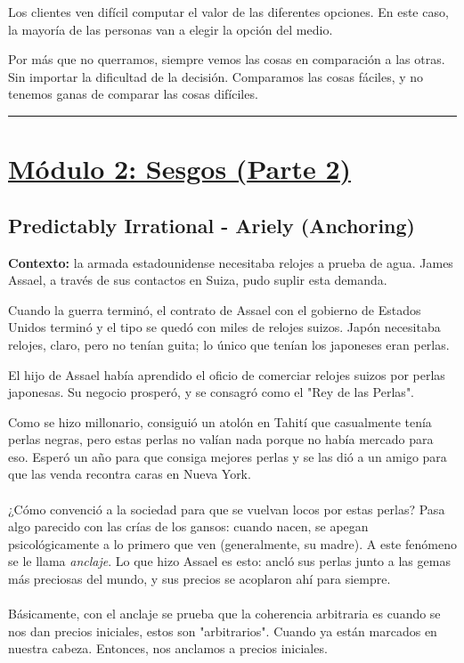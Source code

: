 \documentclass{article}
\newcommand*\sepline{%
  \begin{center}
    \rule[1ex]{.5\textwidth}{.5pt}
  \end{center}}
\begin{document}
            Los clientes ven difícil computar el valor de las diferentes opciones. En este caso, la mayoría de las personas van a elegir la opción del medio.

            Por más que no querramos, siempre vemos las cosas en comparación a las otras. Sin importar la dificultad de la decisión. Comparamos las cosas fáciles, y no tenemos ganas de comparar las cosas difíciles.

    \sepline

    \section*{\underline{Módulo 2: Sesgos (Parte 2)}}
        \subsection*{Predictably Irrational - Ariely (Anchoring)}
            \textbf{Contexto:} la armada estadounidense necesitaba relojes a prueba de agua. James Assael, a través de sus contactos en Suiza, pudo suplir esta demanda.
            
            Cuando la guerra terminó, el contrato de Assael con el gobierno de Estados Unidos terminó y el tipo se quedó con miles de relojes suizos. Japón necesitaba relojes, claro, pero no tenían guita; lo único que tenían los japoneses eran perlas.

            El hijo de Assael había aprendido el oficio de comerciar relojes suizos por perlas japonesas. Su negocio prosperó, y se consagró como el "Rey de las Perlas".

            Como se hizo millonario, consiguió un atolón en Tahití que casualmente tenía perlas negras, pero estas perlas no valían nada porque no había mercado para eso. Esperó un año para que consiga mejores perlas y se las dió a un amigo para que las venda recontra caras en Nueva York.
            \\
            \\
            ¿Cómo convenció a la sociedad para que se vuelvan locos por estas perlas? Pasa algo parecido con las crías de los gansos: cuando nacen, se apegan psicológicamente a lo primero que ven (generalmente, su madre). A este fenómeno se le llama \emph{anclaje}. Lo que hizo Assael es esto: ancló sus perlas junto a las gemas más preciosas del mundo, y sus precios se acoplaron ahí para siempre.
            \\
            \\
            Básicamente, con el anclaje se prueba que la coherencia arbitraria es cuando se nos dan precios iniciales, estos son "arbitrarios". Cuando ya están marcados en nuestra cabeza. Entonces, nos anclamos a precios iniciales.
\end{document}
